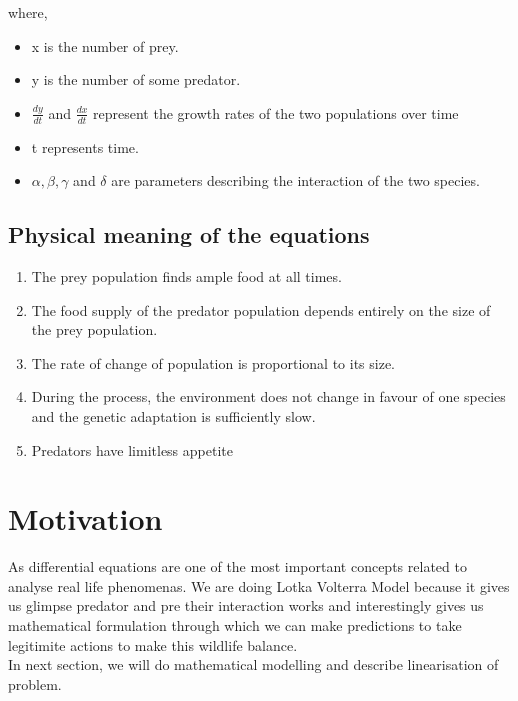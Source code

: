 \documentclass[12pt]{article}
\begin{document}
where,
\begin{itemize}
    \item x is the number of prey.
    \item y is the number of some predator.
    \item $ \frac { d y } { d t } $ and $ \frac { d x } { d t } $ represent the growth rates of the two populations over time
    \item t represents time.
    \item $ \alpha , \beta , \gamma $ and $ \delta $ are parameters describing the interaction of the two species.
\end{itemize}
\subsection*{Physical meaning of the equations}
\begin{enumerate}
    \item The prey population finds ample food at all times.
    \item The food supply of the predator population depends entirely on the size of the prey population.
    \item The rate of change of population is proportional to its size.
    \item During the process, the environment does not change in favour of one species and the genetic adaptation is sufficiently slow.
    \item Predators have limitless appetite

\end{enumerate}
\newpage
\section*{Motivation}
As differential equations are one of the most important concepts related to analyse real life phenomenas. We are doing Lotka Volterra Model because it gives us glimpse predator and pre their interaction works and interestingly gives us mathematical formulation through which we can make predictions to take legitimite actions to make this wildlife balance. \\

In next section, we will do mathematical modelling and describe linearisation of problem.


\end{document}

